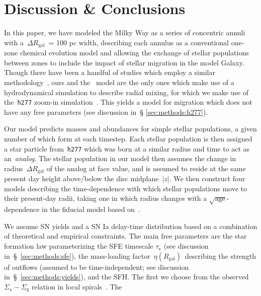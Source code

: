 \documentclass[fleqn, usenatbib]{mnras}
\begin{document}
\section{Discussion \& Conclusions} 
\label{sec:conclusions} 
In this paper, we have modeled the Milky Way as a series of concentric annuli 
with a~$\Delta R_\text{gal}$~= 100 pc width, describing each annulus as a 
conventional one-zone chemical evolution model and allowing the exchange of 
stellar populations between zones to include the impact of stellar migration in 
the model Galaxy. Though there have been a handful of studies which employ a 
similar methodology~\citep{Schoenrich2009, Nidever2015, Sharma2020}, ours and 
the~\citet{Minchev2013, Minchev2014, Minchev2017} model are the only ones which 
make use of a hydrodynamical simulation to describe radial mixing, for which we 
make use of the~\texttt{h277} zoom-in simulation~\citep{Christensen2012, 
Zolotov2012, Loebman2012, Loebman2014, Brooks2014}. This yields a model for 
migration which does not have any free parameters (see discussion in~\S 
\ref{sec:methods:h277}). 
\par 
Our model predicts masses and abundances for simple stellar populations, a 
given number of which form at each timestep. Each stellar 
population is then assigned a star particle from~\texttt{h277} which was born 
at a similar radius and time to act as an~\textit{analog}. The stellar 
population in our model then assumes the change in radius~$\Delta R_\text{gal}$ 
of the analog at face value, and is assumed to reside at the same present day 
height above/below the disc midplane~$\left|z\right|$. We then construct four 
models describing the time-dependence with which stellar populations move to 
their present-day radii, taking one in which radius changes with a 
$\sqrt{\text{age}}$-dependence in the fiducial model based on~\citet[][see 
Fig.~\ref{fig:migration_schema} and discussion in~\S 
\ref{sec:methods:migration}]{Frankel2018, Frankel2020}. 
\par 
We assume SN yields and a SN Ia delay-time distribution based on 
a combination of theoretical and empirical constraints. The main free 
parameters are the star formation law parameterizing the SFE timescale 
$\tau_\star$ (see discussion in~\S~\ref{sec:methods:sfe}), the mass-loading 
factor~$\eta(R_\text{gal})$~describing the strength of outflows (assumed to be 
time-independent; see discussion in~\S~\ref{sec:methods:yields}), and the SFH. 
The first we choose from the observed~$\dot{\Sigma}_\star - \Sigma_\text{g}$ 
relation in local spirals~\citep{Bigiel2010, Leroy2013, Krumholz2018}. The 
\end{document}
